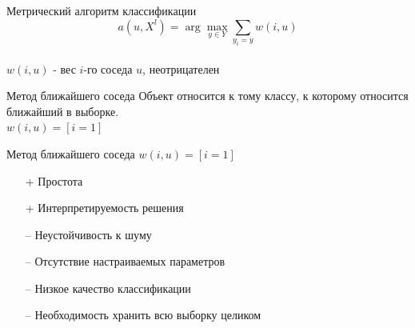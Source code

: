 \documentclass[10pt]{beamer}
\begin{document}
\begin{frame}{Метрический алгоритм классификации}
	$${a(u, X^l) = \arg\max\limits_{y \in Y} \sum\limits_{y_i = y} w(i, u)}$$\\
	\bigbreak
	\bigbreak	
	$w(i, u)$ - вес $i$-го соседа $u$, неотрицателен\\
\end{frame}

\begin{frame}{Метод ближайшего соседа}
	\bigbreak
	Объект относится к тому классу, к которому относится ближайший в выборке.\\
	\bigbreak
	${w(i, u) = [i=1]}$\\
\end{frame}

\begin{frame}{Метод ближайшего соседа}
	\bigbreak
	${w(i, u) = [i=1]}$\\
	\bigbreak
	\begin{itemize} [<+- | alert@+>]
		\item[+] Простота
		\item[+] Интерпретируемость решения
	  \bigbreak
		\item[--	] Неустойчивость к шуму
		\item[--	] Отсутствие настраиваемых параметров
		\item[--	] Низкое качество классификации
		\item[--	] Необходимость хранить всю выборку целиком		
	\end{itemize}
\end{frame}
\end{document}
